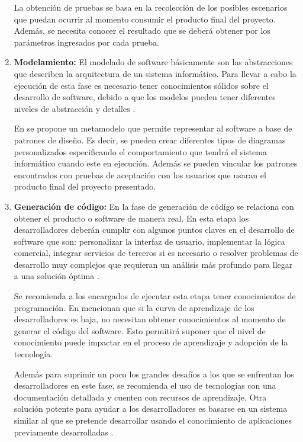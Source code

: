 \begin{enumerate}
	La obtención de pruebas se basa en la recolección de los posibles escenarios que puedan ocurrir al momento consumir el producto final del proyecto. Además, se necesita conocer el resultado que se deberá obtener por los parámetros ingresados por cada prueba. 
	
	\item \textbf{Modelamiento: } El modelado de software básicamente son las abstracciones que describen la arquitectura de un sistema informático. Para llevar a cabo la ejecución de esta fase es necesario tener conocimientos sólidos sobre el desarrollo de software, debido a que los modelos pueden tener diferentes niveles de abstracción y detalles \cite{Kudo}. 
	
	En \cite{Kudo} se propone un metamodelo que permite representar al software a base de patrones de diseño. Es decir, se pueden crear diferentes tipos de diagramas personalizados especificando el comportamiento que tendrá el sistema informático cuando este en ejecución. Además se pueden vincular los patrones encontrados con pruebas de aceptación con los usuarios que usaran el producto final del proyecto presentado. 
	
	\item \textbf{Generación de código:} En la fase de generación de código se relaciona con obtener el producto o software de manera real. En esta etapa los desarrolladores deberán cumplir con algunos puntos claves en el desarrollo de software que son: personalizar la interfaz de usuario, implementar la lógica comercial, integrar servicios de terceros si es necesario o resolver problemas de desarrollo muy complejos que requieran un análisis más profundo para llegar a una solución óptima \cite{Rokis2022}.
	
	Se recomienda a los encargados de ejecutar esta etapa tener conocimientos de programación. En \cite{Rokis2022} mencionan que si la curva de aprendizaje de los desarrolladores es baja, no necesitan obtener conocimientos al momento de generar el código del software. Esto permitirá suponer que el nivel de conocimiento puede impactar en el proceso de aprendizaje y adopción de la tecnología. 
	
	Además para suprimir un poco los grandes desafíos a los que se enfrentan los desarrolladores en este fase, se recomienda el uso de tecnologías con una documentación detallada y cuenten con recursos de aprendizaje. Otra solución potente para ayudar a los desarrolladores es basarse en un sistema similar al que se pretende desarrollar usando el conocimiento de aplicaciones previamente desarrolladas \cite{Rokis2022}.  
	

\end{enumerate}
